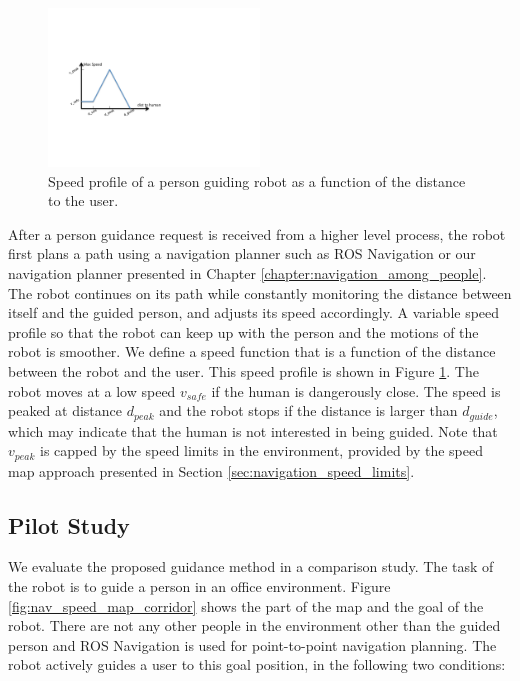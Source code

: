\begin{figure}[ht!]
\centering
\includegraphics[width=0.5\textwidth]{pics/speed_profile_cropped}
\caption{Speed profile of a person guiding robot as a function of the distance to the user.}
\label{fig:guidance_speed_profile}
\end{figure}

After a person guidance request is received from a higher level process, the robot first plans a path using a navigation planner such as ROS Navigation or our navigation planner presented in Chapter \ref{chapter:navigation_among_people}. The robot continues on its path while constantly monitoring the distance between itself and the guided person, and adjusts its speed accordingly. A variable speed profile so that the robot can keep up with the person and the motions of the robot is smoother. We define a speed function that is a function of the distance between the robot and the user. This speed profile is shown in Figure \ref{fig:guidance_speed_profile}. The robot moves at a low speed $v_{safe}$ if the human is dangerously close. The speed is peaked at distance $d_{peak}$ and the robot stops if the distance is larger than $d_{guide}$, which may indicate that the human is not interested in being guided. Note that $v_{peak}$ is capped by the speed limits in the environment, provided by the speed map approach presented in Section \ref{sec:navigation_speed_limits}.

\subsection{Pilot Study}

We evaluate the proposed guidance method in a comparison study. The task of the robot is to guide a person in an office environment. Figure \ref{fig:nav_speed_map_corridor} shows the part of the map and the goal of the robot. There are not any other people in the environment other than the guided person and ROS Navigation is used for point-to-point navigation planning. The robot actively guides a user to this goal position, in the following two conditions:

